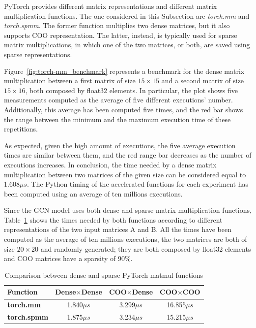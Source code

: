 PyTorch provides different matrix representations and different matrix multiplication functions.
The one considered in this Subsection are \textit{torch.mm} and \textit{torch.spmm}.
The former function multiplies two dense matrices, but it also supports COO representation.
The latter, instead, is typically used for sparse matrix multiplications, in which one of the two matrices, or both, are saved using sparse representations.

Figure~\ref{fig:torch-mm_benchmark} represents a benchmark for the dense matrix multiplication between a first matrix of size $15 \times 15$ and a second matrix of size $15 \times 16$, both composed by float32 elements.
In particular, the plot shows five measurements computed as the average of five different executions' number.
Additionally, this average has been computed five times, and the red bar shows the range between the minimum and the maximum execution time of these repetitions.

As expected, given the high amount of executions, the five average execution times are similar between them, and the red range bar decreases as the number of executions increases.
In conclusion, the time needed by a dense matrix multiplication between two matrices of the given size can be considered equal to 1.608$\mu s$.
The Python timing of the accelerated functions for each experiment has been computed using an average of ten millions executions.

Since the GCN model uses both dense and sparse matrix multiplication functions, Table~\ref{tab:torch-matmul-comparison} shows the times needed by both functions according to different representations of the two input matrices A and B\@.
All the times have been computed as the average of ten millions executions, the two matrices are both of size $20 \times 20$ and randomly generated; they are both composed by float32 elements and COO matrices have a sparsity of 90\%.

\begin{table}[t]
\centering
    \begin{tabular}{|p{6em} c c c |}
    \hline
    \textbf{Function} & \textbf{Dense$\times$Dense} & \textbf{COO$\times$Dense} & \textbf{COO$\times$COO} \T\B \\
    \hline \hline
    \textbf{torch.mm} & 1.840$\mu s$  & 3.299$\mu s$ & 16.855$\mu s$ \T\B\\
    \hline
    \textbf{torch.spmm} & 1.875$\mu s$  & 3.234$\mu s$ & 15.215$\mu s$ \T\B\\
    \hline
    \end{tabular}
    \\[10pt]
    \caption{Comparison between dense and sparse PyTorch matmul functions}
    \label{tab:torch-matmul-comparison}
\end{table}

